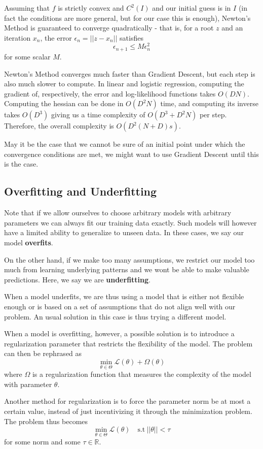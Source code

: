\documentclass{article}
\newcommand{\R}{\mathbb{R}}
\newcommand{\loss}{\mathcal{L}}
\begin{document}
Assuming that $f$ is strictly convex and $C^2(I)$ and our initial guess is in $I$ (in fact the conditions are more general, but for our case this is enough), Newton's Method is guaranteed to converge quadratically - that is, for a root $z$ and an iteration $x_n$, the error $\epsilon_n = ||z - x_n||$ satisfies
$$
\epsilon_{n+1} \leq M \epsilon_n^2
$$
for some scalar $M$.

Newton's Method converges much faster than Gradient Descent, but each step is also much slower to compute.
In linear and logistic regression, computing the gradient of, respectively, the error and log-likelihood functions takes $O(DN)$.
Computing the hessian can be done in $O(D^2N)$ time, and computing its inverse takes $O(D^3)$ giving us a time complexity of $O(D^3 + D^2N)$ per step.
Therefore, the overall complexity is $O(D^2(N+D)s)$.

May it be the case that we cannot be sure of an initial point under which the convergence conditions are met, we might want to use Gradient Descent until this is the case.

\subsection{Overfitting and Underfitting}

Note that if we allow ourselves to choose arbitrary models with arbitrary parameters we can always fit our training data exactly.
Such models will however have a limited ability to generalize to unseen data.
In these cases, we say our model \textbf{overfits}.

On the other hand, if we make too many assumptions, we restrict our model too much from learning underlying patterns and we wont be able to make valuable predictions.
Here, we say we are \textbf{underfitting}.

When a model underfits, we are thus using a model that is either not flexible enough or is based on a set of assumptions that do not align well with our problem.
An usual solution in this case is thus trying a different model.

When a model is overfitting, however, a possible solution is to introduce a regularization parameter that restricts the flexibility of the model.
The problem can then be rephrased as
$$
\min_{\theta \in \Theta} \loss(\theta) + \Omega(\theta)
$$
where $\Omega$ is a regularization function that measures the complexity of the model with parameter $\theta$.

Another method for regularization is to force the parameter norm be at most a certain value, instead of just incentivizing it through the minimization problem.
The problem thus becomes
$$
\min_{\theta \in \Theta} \loss(\theta) \quad \text{s.t} \ ||\theta|| < \tau
$$
for some norm and some $\tau \in \R$.
\end{document}
